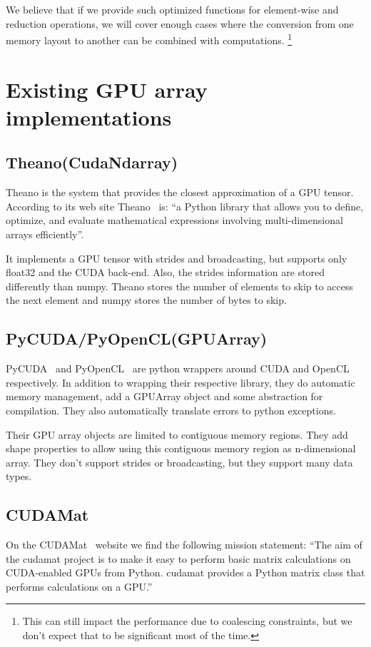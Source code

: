 \documentclass{article} %
\begin{document}
We believe that if we provide such optimized functions for element-wise and reduction operations, we will cover enough cases where the conversion from one memory layout to another can be combined with computations.
\footnote{This can still impact the performance due to coalescing constraints, but we don't expect that to be significant most of the time.}

\section{Existing GPU array implementations}
\subsection{Theano(CudaNdarray)}
Theano is the system that provides the closest approximation of a GPU tensor. 
According to its web site Theano~\citep{bergstra+al:2010-scipy} is: ``a Python library that allows you to define, optimize, and evaluate mathematical expressions involving multi-dimensional arrays efficiently''.

It implements a GPU tensor with strides and broadcasting, but supports only float32 and the CUDA back-end.
Also, the strides information are stored differently than numpy.
Theano stores the number of elements to skip to access the next element and numpy stores the number of bytes to skip.

\subsection{PyCUDA/PyOpenCL(GPUArray)}
PyCUDA~\citep{kloeckner_pycuda_2009} and PyOpenCL~\citep{kloeckner_pycuda_2009} are python wrappers around CUDA and OpenCL respectively. 
In addition to wrapping their respective library, they do automatic memory management, add a GPUArray object and some abstraction for compilation. 
They also automatically translate errors to python exceptions.

Their GPU array objects are limited to contiguous memory regions.
They add shape properties to allow using this contiguous memory region as n-dimensional array.
They don't support strides or broadcasting, but they support many data types.

\subsection{CUDAMat}
On the CUDAMat~\citep{cudamat-TR2009} website we find the following mission statement: ``The aim of the cudamat project is to make it easy to perform basic matrix calculations on CUDA-enabled GPUs from Python. cudamat provides a Python matrix class that performs calculations on a GPU.''
\end{document}
